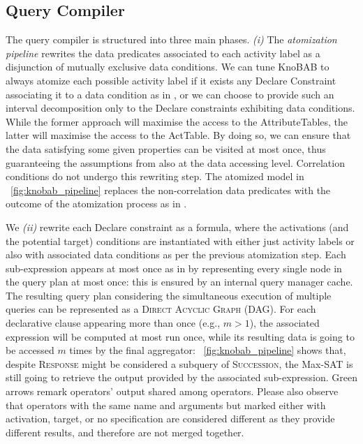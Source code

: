\subsection{Query Compiler}\label{sec:qc}
The query compiler is structured into three main phases. \textit{(i)} The \textit{atomization pipeline}  rewrites the data predicates 
associated to each activity label as a 
disjunction of mutually exclusive data conditions. We can tune KnoBAB to always atomize each possible activity label if it exists any Declare Constraint associating it to a data condition as in \cite{bpm21}, or we can choose to provide such an interval decomposition only to the Declare constraints exhibiting data conditions. While the former approach will maximise the access to the \textsf{AttributeTable}s, the latter will maximise the access to the \textsf{ActTable}. By doing so, we can ensure that the data satisfying some given properties can be visited at most once, thus guaranteeing the assumptions from \cite{BellatrecheKB21} also at the data accessing level. Correlation conditions do not undergo this rewriting step. The atomized model in \figurename~\ref{fig:knobab_pipeline} replaces the non-correlation data predicates with the outcome of the atomization process as in \cite{bpm21}. 


We \textit{(ii)} rewrite each Declare constraint as a \xLTLf formula, where the activations (and the potential target) conditions are instantiated with either just activity labels or also with associated data conditions as per the previous atomization step. 
Each sub-expression appears at most once as in \cite{BellatrecheKB21} by representing every single node in the query plan at most once: this is ensured by an internal query manager cache. The resulting query plan considering the simultaneous execution of multiple queries can be represented as a \textsc{Direct Acyclic Graph} (DAG).  
For each declarative clause appearing more than once (e.g., $m>1$), the associated \xLTLf expression will be computed at most run once, while its resulting data is going to be accessed $m$ times by the final aggregator: \figurename~\ref{fig:knobab_pipeline} shows that, despite \textsc{Response} might be considered a subquery of \textsc{Succession}, the Max-SAT is still going to retrieve the output provided by the associated sub-expression. Green arrows remark operators' output shared among operators. Please also observe that operators with the same name and arguments but marked either with activation, target, or no specification are considered different as they provide different results, and therefore are not merged together. 

